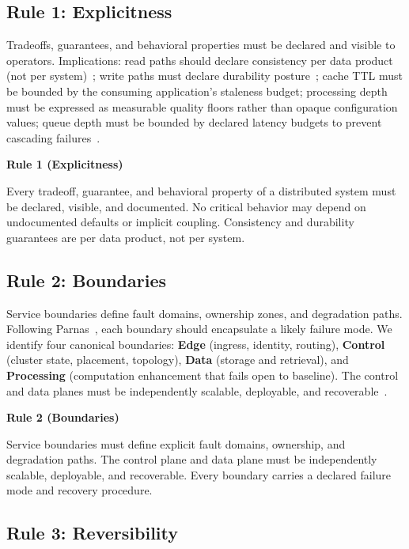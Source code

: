 \documentclass[conference]{IEEEtran}
\newenvironment{majorrule}[1]{%
    \vspace{0.5em}\noindent
    \colorbox{rulecolor!10!white}{%
        \parbox{\dimexpr\linewidth-2\fboxsep}{%
            \vspace{0.3em}\small\textbf{\textcolor{rulecolor}{Rule #1}}\vspace{0.2em}%
        }%
    }%
}{\vspace{0.5em}}
\begin{document}
\subsection{Rule 1: Explicitness}

Tradeoffs, guarantees, and behavioral properties must be declared and visible to operators. Implications: read paths should declare consistency per data product (not per system)~\cite{dynamo}; write paths must declare durability posture~\cite{raft}; cache TTL must be bounded by the consuming application's staleness budget; processing depth must be expressed as measurable quality floors rather than opaque configuration values; queue depth must be bounded by declared latency budgets to prevent cascading failures~\cite{kafka}.

\begin{majorrule}{1 (Explicitness)}
Every tradeoff, guarantee, and behavioral property of a distributed system must be declared, visible, and documented. No critical behavior may depend on undocumented defaults or implicit coupling. Consistency and durability guarantees are per data product, not per system.
\end{majorrule}

\subsection{Rule 2: Boundaries}

Service boundaries define fault domains, ownership zones, and degradation paths. Following Parnas~\cite{parnas1972criteria}, each boundary should encapsulate a likely failure mode. We identify four canonical boundaries: \textbf{Edge} (ingress, identity, routing), \textbf{Control} (cluster state, placement, topology), \textbf{Data} (storage and retrieval), and \textbf{Processing} (computation enhancement that fails open to baseline). The control and data planes must be independently scalable, deployable, and recoverable~\cite{bigtable}.

\begin{majorrule}{2 (Boundaries)}
Service boundaries must define explicit fault domains, ownership, and degradation paths. The control plane and data plane must be independently scalable, deployable, and recoverable. Every boundary carries a declared failure mode and recovery procedure.
\end{majorrule}

\subsection{Rule 3: Reversibility}
\end{document}
